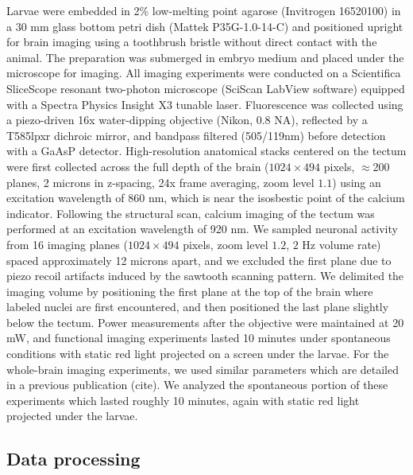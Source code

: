 \documentclass{article}
\begin{document}
Larvae were embedded in 2\% low-melting point agarose (Invitrogen 16520100) in a 30 mm glass bottom petri dish (Mattek P35G-1.0-14-C) and positioned upright for brain imaging using a toothbrush bristle without direct contact with the animal. The preparation was submerged in embryo medium and placed under the microscope for imaging. All imaging experiments were conducted on a Scientifica SliceScope resonant two-photon microscope (SciScan LabView software) equipped with a Spectra Physics Insight X3 tunable laser. Fluorescence was collected using a piezo-driven 16x water-dipping objective (Nikon, 0.8 NA), reflected by a T585lpxr dichroic mirror, and bandpass filtered (505/119nm) before detection with a GaAsP detector. High-resolution anatomical stacks centered on the tectum were first collected across the full depth of the brain ($1024\times494$ pixels, $\approx$200 planes, 2 microns in z-spacing, 24x frame averaging, zoom level $1.1$) using an excitation wavelength of 860 nm, which is near the isosbestic point of the calcium indicator. Following the structural scan, calcium imaging of the tectum was performed at an excitation wavelength of 920 nm. We sampled neuronal activity from 16 imaging planes ($1024\times494$ pixels, zoom level $1.2$, $2$ Hz volume rate) spaced approximately 12 microns apart, and we excluded the first plane due to piezo recoil artifacts induced by the sawtooth scanning pattern. We delimited the imaging volume by positioning the first plane at the top of the brain where labeled nuclei are first encountered, and then positioned the last plane slightly below the tectum. Power measurements after the objective were maintained at 20 mW, and functional imaging experiments lasted 10 minutes under spontaneous conditions with static red light projected on a screen under the larvae. For the whole-brain imaging experiments, we used similar parameters which are detailed in a previous publication (cite). We analyzed the spontaneous portion of these experiments which lasted roughly 10 minutes, again with static red light projected under the larvae.

\subsection*{Data processing}
\end{document}
